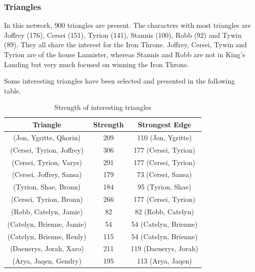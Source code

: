 \documentclass[10pt,twocolumn,letterpaper]{article}
\begin{document}
\subsubsection{Triangles}

In this network, 900 triangles are present. The characters with most triangles are Joffrey (176), Cersei (151), Tyrion (141), Stannis (100), Robb (92) and Tywin (89).
They all share the interest for the Iron Throne. Joffrey, Cersei, Tywin and Tyrion are of the house Lannister, whereas Stannis and Robb are not in King's Landing but very much focused on winning the Iron Throne.


Some interesting triangles have been selected and presented in the following table.

\begin{table}[!h]
    \centering
    \small
    \begin{tabular}{c|c|c}
        Triangle & Strength & Strongest Edge  \\
        \hline
        \small{(Jon, Ygritte, Qhorin)} & 209 & 110 \small{(Jon, Ygritte)} \\
        \small{(Cersei, Tyrion, Joffrey)} & 306 & 177 \small{(Cersei, Tyrion)} \\
        \small{(Cersei, Tyrion, Varys)} & 291 & 177 \small{(Cersei, Tyrion)} \\
        \small{(Cersei, Joffrey, Sansa)} & 179 & 73 \small{(Cersei, Sansa)} \\
        \small{(Tyrion, Shae, Bronn)} & 184 & 95 \small{(Tyrion, Shae)} \\
        \small{(Cersei, Tyrion, Bronn)} & 266 & 177 \small{(Cersei, Tyrion)} \\
        \small{(Robb, Catelyn, Jamie)} & 82 & 82 \small{(Robb, Catelyn)} \\
        \small{(Catelyn, Brienne, Jamie)} & 54 & 54 \small{(Catelyn, Brienne)} \\
        \small{(Catelyn, Brienne, Renly)} & 115 & 54 \small{(Catelyn, Brienne)} \\
        \small{(Daenerys, Jorah, Xaro)} & 211 & 119 \small{(Daenerys, Jorah)} \\
        \small{(Arya, Jaqen, Gendry)} & 195 & 113 \small{(Arya, Jaqen)} \\
        \hline
    \end{tabular}
    \vspace{0.2cm}
    \caption{Strength of interesting triangles}
    \label{tab:my_label}
\end{table}
\end{document}
